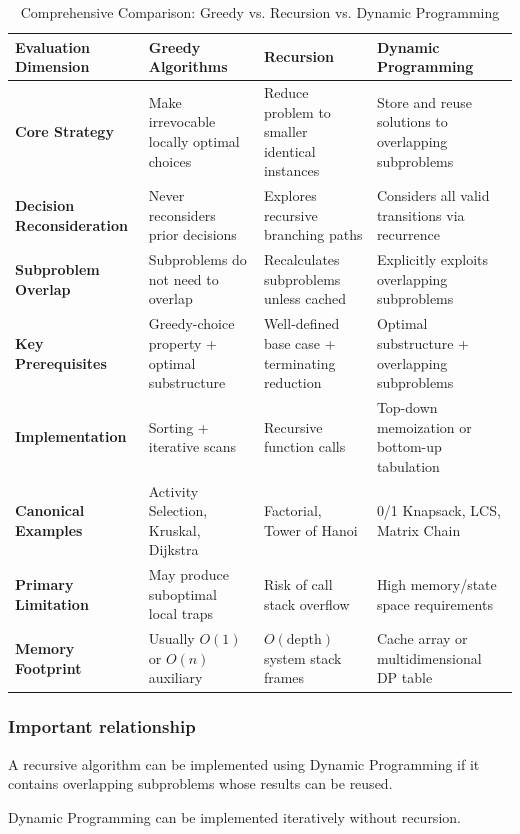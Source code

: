 \begin{table}[htbp]
\centering
\caption{Comprehensive Comparison: Greedy vs. Recursion vs. Dynamic Programming}
\label{tab:master_paradigms}
\begin{tabularx}{\textwidth}{p{2.8cm} X X X}
\toprule
\textbf{Evaluation Dimension} & \textbf{Greedy Algorithms} & \textbf{Recursion} & \textbf{Dynamic Programming} \\
\midrule
\textbf{Core Strategy} & Make irrevocable locally optimal choices & Reduce problem to smaller identical instances & Store and reuse solutions to overlapping subproblems \\
\textbf{Decision Reconsideration} & Never reconsiders prior decisions & Explores recursive branching paths & Considers all valid transitions via recurrence \\
\textbf{Subproblem Overlap} & Subproblems do not need to overlap & Recalculates subproblems unless cached & Explicitly exploits overlapping subproblems \\
\textbf{Key Prerequisites} & Greedy-choice property + optimal substructure & Well-defined base case + terminating reduction & Optimal substructure + overlapping subproblems \\
\textbf{Implementation} & Sorting + iterative scans & Recursive function calls & Top-down memoization or bottom-up tabulation \\
\textbf{Canonical Examples} & Activity Selection, Kruskal, Dijkstra & Factorial, Tower of Hanoi & 0/1 Knapsack, LCS, Matrix Chain \\
\textbf{Primary Limitation} & May produce suboptimal local traps & Risk of call stack overflow & High memory/state space requirements \\
\textbf{Memory Footprint} & Usually $O(1)$ or $O(n)$ auxiliary & $O(\text{depth})$ system stack frames & Cache array or multidimensional DP table \\
\bottomrule
\end{tabularx}
\end{table}

\subsubsection{Important relationship}

A recursive algorithm can be implemented using Dynamic Programming if it contains overlapping subproblems whose results can be reused.

Dynamic Programming can be implemented iteratively without recursion.

